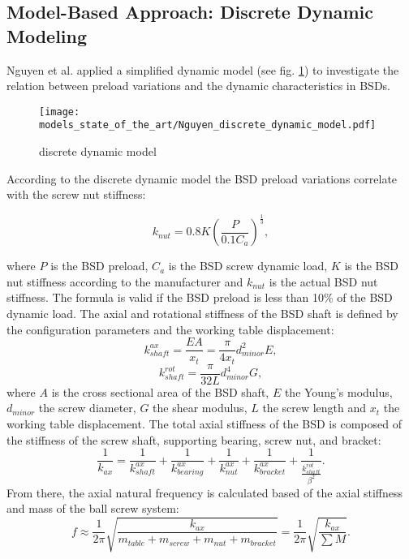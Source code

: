 \subsection{Model-Based Approach: Discrete Dynamic Modeling}
Nguyen et al. \cite{NGUYEN2019} applied a simplified dynamic model (see fig. \ref{fig:Nguyen_discrete_dynamic_model}) to investigate the relation between preload variations and the dynamic characteristics in BSDs.

\begin{figure}[H]
  \centering
  \texttt{[image: models\_state\_of\_the\_art/Nguyen\_discrete\_dynamic\_model.pdf]}
  \caption{discrete dynamic model \cite{NGUYEN2019}}
  \label{fig:Nguyen_discrete_dynamic_model}
\end{figure}

According to the discrete dynamic model the BSD preload variations correlate with the screw nut stiffness:

\begin{equation}
    k_{nut}=0.8K(\frac{P}{0.1C_{a}})^{\frac{1}{3}},
\end{equation}

where $P$ is the BSD preload, $C_{a}$ is the BSD screw dynamic load, $K$ is the BSD nut stiffness according to the manufacturer and $k_{nut}$ is the actual BSD nut stiffness. The formula is valid if the BSD preload is less than 10\% of the BSD dynamic load. The axial and rotational stiffness of the BSD shaft is defined by the configuration parameters and the working table displacement:
\begin{equation}
    k_{shaft}^{ax}=\frac{EA}{x_{t}}=\frac{\pi}{4x_{t}}d_{minor}^{2}E,
\end{equation}
\begin{equation}
    k_{shaft}^{rot}=\frac{\pi}{32L}d_{minor}^{4}G,
\end{equation}
 where $A$ is the cross sectional area of the BSD shaft, $E$ the Young’s modulus, $d_{minor}$ the screw diameter, $G$ the shear modulus, $L$ the screw length and $x_{t}$ the working table displacement. The total axial stiffness of the BSD is composed of the stiffness of the screw shaft, supporting bearing, screw nut, and bracket:
 \begin{equation}
    \frac{1}{k_{ax}}=\frac{1}{k_{shaft}^{ax}}+\frac{1}{k_{bearing}^{ax}}+\frac{1}{k_{nut}^{ax}}+\frac{1}{k_{bracket}^{ax}}+\frac{1}{\frac{k_{shaft}^{rot}}{\beta^{2}}}.
\end{equation}
From there, the axial natural frequency is calculated based of the axial stiffness and mass of the ball screw system:
\begin{equation}
    f\approx\frac{1}{2\pi}\sqrt{\frac{k_{ax}}{m_{table}+m_{screw}+m_{nut}+m_{bracket}}}=\frac{1}{2\pi}\sqrt{\frac{k_{ax}}{\sum M}}.
\end{equation}


